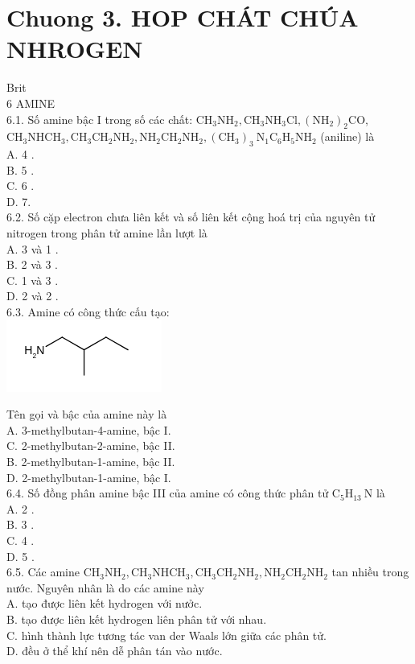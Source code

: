 \documentclass[10pt]{article}
\begin{document}
\section*{Chuong 3. HOP CHÁT CHÚA NHROGEN}
Brit\\
6 AMINE\\
6.1. Số amine bậc I trong số các chất: $\mathrm{CH}_{3} \mathrm{NH}_{2}, \mathrm{CH}_{3} \mathrm{NH}_{3} \mathrm{Cl},\left(\mathrm{NH}_{2}\right)_{2} \mathrm{CO}$, $\mathrm{CH}_{3} \mathrm{NHCH}_{3}, \mathrm{CH}_{3} \mathrm{CH}_{2} \mathrm{NH}_{2}, \mathrm{NH}_{2} \mathrm{CH}_{2} \mathrm{NH}_{2},\left(\mathrm{CH}_{3}\right)_{3} \mathrm{~N}_{1} \mathrm{C}_{6} \mathrm{H}_{5} \mathrm{NH}_{2}$ (aniline) là\\
A. 4 .\\
B. 5 .\\
C. 6 .\\
D. 7.\\
6.2. Số cặp electron chưa liên kết và số liên kết cộng hoá trị của nguyên tử nitrogen trong phân tử amine lần lượt là\\
A. 3 và 1 .\\
B. 2 và 3 .\\
C. 1 và 3 .\\
D. 2 và 2 .\\
6.3. Amine có công thức cấu tạo:\\
\includegraphics{smile-8561bb756918fd23d9a17978a59a5e35a349e074}

Tên gọi và bậc của amine này là\\
A. 3-methylbutan-4-amine, bậc I.\\
C. 2-methylbutan-2-amine, bậc II.\\
B. 2-methylbutan-1-amine, bậc II.\\
D. 2-methylbutan-1-amine, bậc I.\\
6.4. Số đồng phân amine bậc III của amine có công thức phân tử $\mathrm{C}_{5} \mathrm{H}_{13} \mathrm{~N}$ là\\
A. 2 .\\
B. 3 .\\
C. 4 .\\
D. 5 .\\
6.5. Các amine $\mathrm{CH}_{3} \mathrm{NH}_{2}, \mathrm{CH}_{3} \mathrm{NHCH}_{3}, \mathrm{CH}_{3} \mathrm{CH}_{2} \mathrm{NH}_{2}, \mathrm{NH}_{2} \mathrm{CH}_{2} \mathrm{NH}_{2}$ tan nhiều trong nước. Nguyên nhân là do các amine này\\
A. tạo được liên kết hydrogen với nưởc.\\
B. tạo được liên kết hydrogen liên phân tử với nhau.\\
C. hình thành lực tương tác van der Waals lớn giữa các phân tử.\\
D. đều ở thể khí nên dễ phân tán vào nước.
\end{document}
